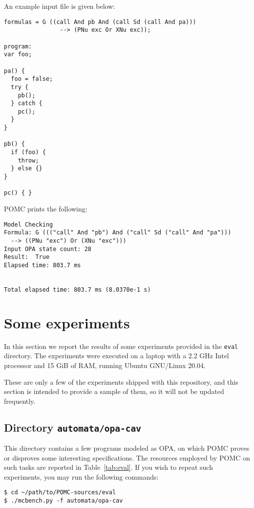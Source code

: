 \documentclass[9pt,a4paper]{article}
\begin{document}
An example input file is given below:
\begin{verbatim}
formulas = G ((call And pb And (call Sd (call And pa)))
                --> (PNu exc Or XNu exc));

program:
var foo;

pa() {
  foo = false;
  try {
    pb();
  } catch {
    pc();
  }
}

pb() {
  if (foo) {
    throw;
  } else {}
}

pc() { }
\end{verbatim}

POMC prints the following:
\begin{verbatim}
Model Checking
Formula: G ((("call" And "pb") And ("call" Sd ("call" And "pa")))
  --> ((PNu "exc") Or (XNu "exc")))
Input OPA state count: 28
Result:  True
Elapsed time: 803.7 ms


Total elapsed time: 803.7 ms (8.0370e-1 s)
\end{verbatim}


\section{Some experiments}
\label{sec:exp}

In this section we report the results of some experiments
provided in the \texttt{eval} directory.
The experiments were executed on a laptop with a 2.2 GHz Intel processor
and 15 GiB of RAM, running Ubuntu GNU/Linux 20.04.

These are only a few of the experiments shipped with this repository,
and this section is intended to provide a sample of them,
so it will not be updated frequently.

\subsection{Directory \texttt{automata/opa-cav}}
\label{sec:exp-opa}

This directory contains a few programs modeled as OPA,
on which POMC proves or disproves some interesting specifications.
The resources employed by POMC on such tasks are reported in Table~\ref{tab:eval}.
If you wish to repeat such experiments, you may run the following
commands:
\begin{verbatim}
$ cd ~/path/to/POMC-sources/eval
$ ./mcbench.py -f automata/opa-cav
\end{verbatim}
\end{document}
